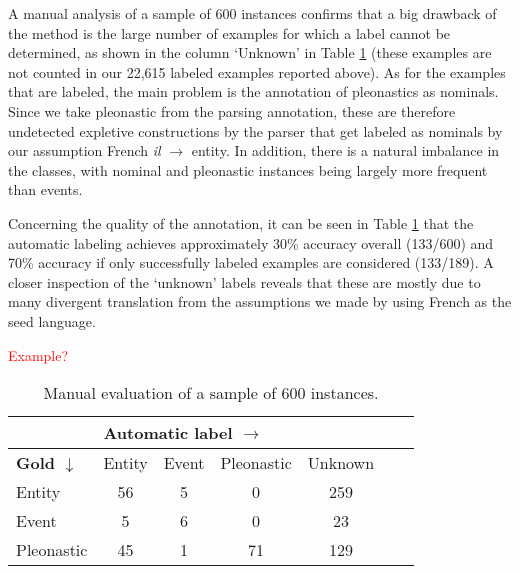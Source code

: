 \documentclass[10pt, a4paper]{article}
\begin{document}
A manual analysis of a sample of 600 instances confirms that a big drawback of  
the method is the large number of examples for which a label cannot be determined, 
as shown in the column `Unknown' in Table \ref{tab:manualsample600} (these examples are not counted in our 22,615 labeled examples reported above). 
As for the examples that are labeled, the main 
problem is the annotation of pleonastics as nominals. Since we take pleonastic 
from the parsing annotation, these are therefore undetected expletive constructions by the parser that get labeled as nominals by our assumption French \textit{il} $\rightarrow$ entity. In addition, 
there is a natural imbalance in the classes, with 
nominal and pleonastic instances being largely more frequent than events.  

Concerning the quality of the annotation, it can
be seen in Table \ref{tab:manualsample600} that the automatic labeling achieves 
approximately 30\% accuracy overall (133/600) and 70\% accuracy if only successfully labeled  
examples are considered (133/189). A closer 
inspection of the `unknown' labels reveals that these are mostly due to many 
divergent translation from the assumptions we made by using French as the seed 
language.  


\textcolor{red}{Example?}


\begin{table}[h!]\centering 
\begin{tabular}{p{1.3cm}|cccccc} 
&\multicolumn{4}{l}{\textbf{Automatic label $\rightarrow$}}\\
\toprule 
{\textbf{Gold $\downarrow$}}&Entity & Event &Pleonastic & Unknown \\ 
\midrule Entity &   56  &  5   &   0     &  259  \\ 
Event &    5  &  6   &  0  &  23\\ 
Pleonastic& 45 & 1&  71&  129\\
\bottomrule 
\end{tabular} \caption{Manual evaluation of a sample of 600
instances.}\label{tab:manualsample600} 
\end{table}

%
%
%
%
\end{document}
